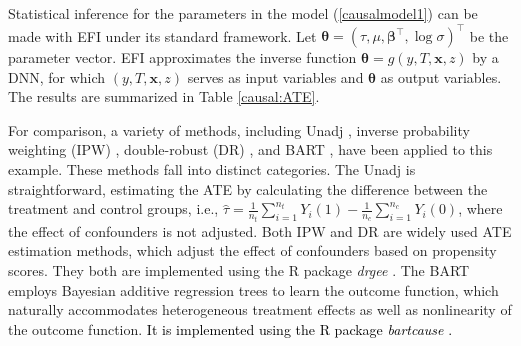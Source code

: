 \documentclass[11pt]{article}
\newcommand{\bx}{{\boldsymbol x}}
\newcommand{\bbeta}{{\boldsymbol \beta}}
\newcommand{\btheta}{{\boldsymbol \theta}}
\begin{document}
Statistical inference for the parameters in the model (\ref{causalmodel1}) can be made  with EFI under its standard framework.  Let $\btheta=(\tau,\mu,\bbeta^{\top},\log \sigma)^{\top}$ be the parameter vector.  EFI approximates the inverse function $\btheta=g(y,T,\bx,z)$ by a DNN, for which $(y,T,\bx,z)$ serves as input variables and $\btheta$ as output variables. The results are summarized in Table \ref{causal:ATE}. 

For comparison, a variety of methods, including Unadj \citep{imbensrubin2015}, inverse probability weighting (IPW) \citep{Rosenbaum1987ModelBasedDA}, double-robust (DR) \citep{rrz94, Bang2005DoublyRE}, and BART \citep{Hill2011bart}, have been applied to this example. These methods fall into distinct categories. 
The Unadj is straightforward, estimating the ATE by calculating the difference between the treatment and control groups, i.e., $\hat{\tau}=\frac{1}{n_t} \sum_{i=1}^{n_t} Y_i(1)- \frac{1}{n_c} \sum_{i=1}^{n_c} Y_i(0)$,
where the effect of confounders is not adjusted. 
Both IPW and DR are widely used ATE estimation methods, which adjust the effect of confounders based on propensity scores. They both are implemented using the R package {\it drgee} \citep{drimplement}. 
The BART employs Bayesian additive regression trees to learn the outcome function,  
which naturally accommodates  heterogeneous treatment effects as well as 
nonlinearity of the outcome function. \textcolor{black}{It is implemented using the R package {\it bartcause} \citep{Dorie2020CausalIU}. }
\end{document}
